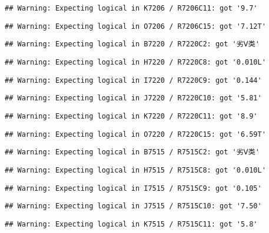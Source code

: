 \documentclass[
]{article}
\begin{document}
\begin{verbatim}
## Warning: Expecting logical in K7206 / R7206C11: got '9.7'
\end{verbatim}

\begin{verbatim}
## Warning: Expecting logical in O7206 / R7206C15: got '7.12T'
\end{verbatim}

\begin{verbatim}
## Warning: Expecting logical in B7220 / R7220C2: got '劣Ⅴ类'
\end{verbatim}

\begin{verbatim}
## Warning: Expecting logical in H7220 / R7220C8: got '0.010L'
\end{verbatim}

\begin{verbatim}
## Warning: Expecting logical in I7220 / R7220C9: got '0.144'
\end{verbatim}

\begin{verbatim}
## Warning: Expecting logical in J7220 / R7220C10: got '5.81'
\end{verbatim}

\begin{verbatim}
## Warning: Expecting logical in K7220 / R7220C11: got '8.9'
\end{verbatim}

\begin{verbatim}
## Warning: Expecting logical in O7220 / R7220C15: got '6.59T'
\end{verbatim}

\begin{verbatim}
## Warning: Expecting logical in B7515 / R7515C2: got '劣Ⅴ类'
\end{verbatim}

\begin{verbatim}
## Warning: Expecting logical in H7515 / R7515C8: got '0.010L'
\end{verbatim}

\begin{verbatim}
## Warning: Expecting logical in I7515 / R7515C9: got '0.105'
\end{verbatim}

\begin{verbatim}
## Warning: Expecting logical in J7515 / R7515C10: got '7.50'
\end{verbatim}

\begin{verbatim}
## Warning: Expecting logical in K7515 / R7515C11: got '5.8'
\end{verbatim}
\end{document}
